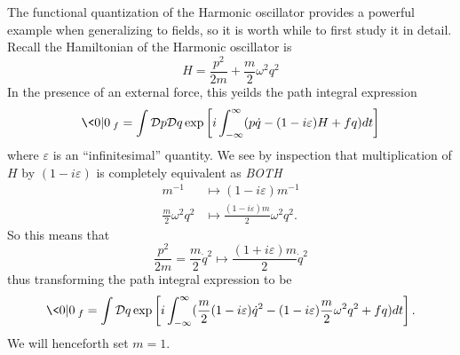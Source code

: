 
The functional quantization of the Harmonic oscillator provides a
powerful example when generalizing to fields, so it is worth
while to first study it in detail. Recall the Hamiltonian of the
Harmonic oscillator is
\begin{equation}%
H = \frac{p^{2}}{2m} + \frac{m}{2}\omega^{2}q^{2}
\end{equation}
In the presence of an external force, this yeilds the path
integral expression
\begin{equation}%
\<0|0\>_{f} = \int\mathcal{D}p\mathcal{D}q\exp\left[i\int^{\infty}_{-\infty}(p\dot{q}-(1-i\varepsilon)H+fq)dt\right]
\end{equation}
where $\varepsilon$ is an ``infinitesimal'' quantity. We see by
inspection that multiplication of $H$ by $(1-i\varepsilon)$ is
completely equivalent as \emph{BOTH}
\begin{subequations}
\begin{align}
m^{-1}&\mapsto(1-i\varepsilon)m^{-1}\\
\frac{m}{2}\omega^{2}q^{2}&\mapsto\frac{(1-i\varepsilon)m}{2}\omega^{2}q^{2}.
\end{align}
\end{subequations}
So this means that
\begin{equation}%
\frac{p^{2}}{2m}=\frac{m}{2}\dot{q}^{2}\mapsto \frac{(1+i\varepsilon)m}{2}\dot{q}^{2}
\end{equation}
thus transforming the path integral expression to be
\begin{equation}\label{eq:pathIntegralExpressionForHarmonicOscillator}
\<0|0\>_{f} =  \int\mathcal{D}q\exp\left[i\int^{\infty}_{-\infty}(\frac{m}{2}(1-i\varepsilon)\dot{q}^{2}-(1-i\varepsilon)\frac{m}{2}\omega^{2}q^{2}+fq)dt\right].
\end{equation}
We will henceforth set $m=1$.

